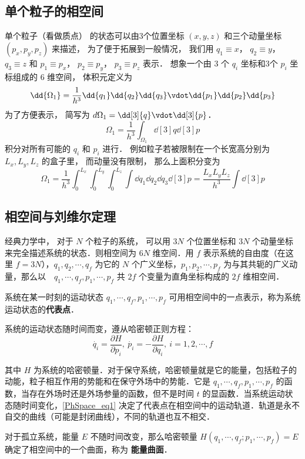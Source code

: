 
\begin{issues}
\issueDraft
\end{issues}

\subsection{单个粒子的相空间}

单个粒子（看做质点） 的状态可以由3个位置坐标 $(x,y,z)$ 和三个动量坐标 $(p_x, p_y, p_z)$ 来描述， 为了便于拓展到一般情况， 我们用 $q_1 \equiv x$，   $q_2 \equiv y$， $q_3 \equiv z$   和 $p_1 \equiv p_x$， $p_2 \equiv p_y$， $p_3 \equiv p_z$ 表示． 想象一个由 3 个 $q_i$  坐标和3个 $p_i$  坐标组成的 $6$ 维空间， 体积元定义为
\begin{equation}
\dd{\Omega_1} = \frac{1}{h^3} \dd{q_1}\dd{q_2}\dd{q_3} \vdot \dd{p_1}\dd{p_2}\dd{p_3}
\end{equation} 
为了方便表示， 简写为  $d{\Omega_1} = \dd[3]{q} \vdot \dd[3]{p}$． 
\begin{equation}
\Omega_1 = \frac{1}{h^3} \int_{\Omega_1} \dd[3]{q} \dd[3]{p}
\end{equation} 
积分对所有可能的 $q_i$ 和 $p_i$ 进行． 例如粒子若被限制在一个长宽高分别为 $L_x, L_y, L_z$ 的盒子里， 而动量没有限制， 那么上面积分变为
\begin{equation}
\Omega_1 = \frac{1}{h^3} \int_0^{L_x} \int_0^{L_y} \int_0^{L_z} \int \dd{q_1} \dd{q_2} \dd{q_3} \dd[3]{p} = \frac{L_x L_y L_z}{h^3} \int \dd[3]{p} 
\end{equation} 

\subsection{相空间与刘维尔定理}
经典力学中， 对于 $N$ 个粒子的系统， 可以用 $3N$ 个位置坐标和 $3N$ 个动量坐标来完全描述系统的状态．则相空间为 $6N$ 维空间．用 $f$ 表示系统的自由度（在这里 $f=3N$），$q_1,q_2,\cdots,q_f$ 为它的 $N$ 个广义坐标，$p_1,p_2,\cdots,p_f$ 为与其共轭的广义动量，那么以　$q_1,\cdots,q_f,p_1,\cdots,p_f$ 共 $2f$ 个变量为直角坐标构成的 $2f$ 维相空间．

系统在某一时刻的运动状态 $q_1,\cdots,q_f,p_1,\cdots,p_f$ 可用相空间中的一点表示，称为系统运动状态的\textbf{代表点}．

系统的运动状态随时间而变，遵从哈密顿正则方程：
\begin{equation}\label{PhSpace_eq1}
\dot{q_i}=\frac{\partial H}{\partial p_i},\ \dot{p_i}=-\frac{\partial H}{\partial q_i},\ i=1,2,\cdots,f
\end{equation}

其中 $H$ 为系统的哈密顿量．对于保守系统，哈密顿量就是它的能量，包括粒子的动能，粒子相互作用的势能和在保守外场中的势能．它是 $q_1,\cdots,q_f,p_1,\cdots,p_f$ 的函数，当存在外场时还是外场参量的函数，但不是时间 $t$ 的显函数．当系统运动状态随时间变化，\autoref{PhSpace_eq1} 决定了代表点在相空间中的运动轨道．轨道是永不自交的曲线（可能是封闭曲线），不同的轨道也互不相交．

对于孤立系统，能量 $E$ 不随时间改变，那么哈密顿量 $H(q_1,\cdots,q_f;p_1,\cdots,p_f)=E$ 确定了相空间中的一个曲面，称为 \textbf{能量曲面}．